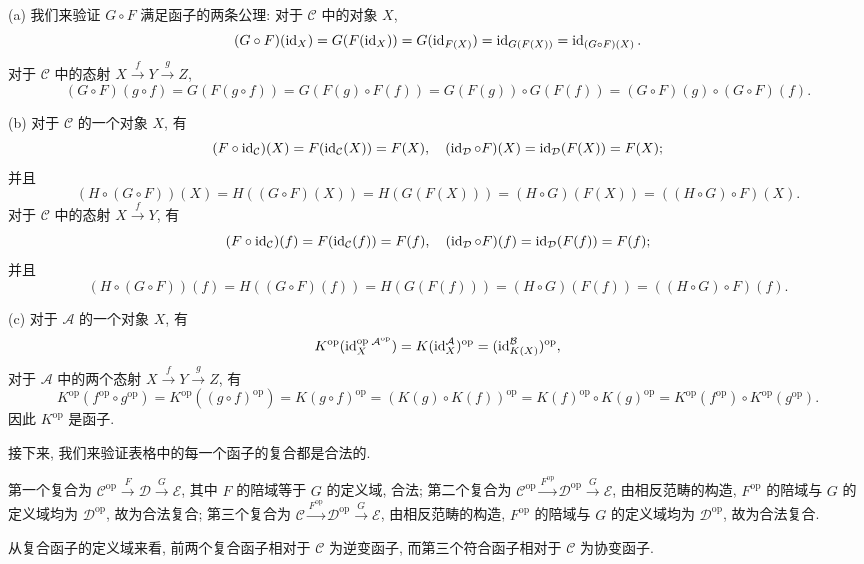\documentclass{article}
\newcommand{\op}{^{\mathrm{op}}}
\begin{document}
\begin{solution}
	(a) 我们来验证 $G\circ F$ 满足函子的两条公理: 对于 $\mathcal{C}$ 中的对象 $X$, 
	\[ (G\circ F)(\operatorname{id}_X) = G(F(\operatorname{id}_X)) = G(\operatorname{id}_{F(X)}) = \operatorname{id}_{G(F(X))} = \operatorname{id}_{(G\circ F)(X)}. \]
	对于 $\mathcal{C}$ 中的态射 $X \xrightarrow{f} Y \xrightarrow{g} Z$,
	\[ (G\circ F)(g\circ f) = G(F(g\circ f)) = G(F(g) \circ F(f))
	= G(F(g)) \circ G(F(f)) = (G\circ F)(g) \circ (G\circ F)(f). \]

	(b) 对于 $\mathcal{C}$ 的一个对象 $X$, 有
	\[ (F\circ \operatorname{id}_\mathcal{C}) (X) = F(\operatorname{id}_\mathcal{C}(X)) = F(X),\quad 
	(\operatorname{id}_\mathcal{D} \circ F)(X) = \operatorname{id}_\mathcal{D}(F(X)) = F(X); \]
	并且
	\[ (H\circ(G\circ F))(X) = H((G\circ F)(X)) = H(G(F(X)))
	=(H\circ G)(F(X)) = ((H\circ G)\circ F)(X). \]
	对于 $\mathcal{C}$ 中的态射 $X \xrightarrow{f}Y$, 有
	\[ (F\circ \operatorname{id}_\mathcal{C}) (f) = F(\operatorname{id}_\mathcal{C}(f)) = F(f),\quad 
	(\operatorname{id}_\mathcal{D} \circ F)(f) = \operatorname{id}_\mathcal{D}(F(f)) = F(f); \]
	并且
	\[ (H\circ(G\circ F))(f) = H((G\circ F)(f)) = H(G(F(f)))
	=(H\circ G)(F(f)) = ((H\circ G)\circ F)(f). \]

	(c) 对于 $\mathcal{A}$ 的一个对象 $X$, 有 
	\[ K\op(\id_X\op{}^{\mathcal{A}\op}) = K(\id_X^{\mathcal{A}})\op = (\id_{K(X)}^{\mathcal{B}})\op, \]
	对于 $\mathcal{A}$ 中的两个态射 $X \xrightarrow{f} Y \xrightarrow{g} Z$, 有
	\[ K\op(f\op \circ g\op) = K\op((g\circ f)\op) = K(g\circ f)\op
	=(K(g) \circ K(f))\op = K(f)\op \circ K(g)\op
	=K\op(f\op)\circ K\op(g\op). \]
	因此 $K\op$ 是函子.

	接下来, 我们来验证表格中的每一个函子的复合都是合法的. 

	第一个复合为 $\mathcal{C}\op \xrightarrow{F} \mathcal{D} \xrightarrow{G} \mathcal{E}$, 其中 $F$ 的陪域等于 $G$ 的定义域, 合法; 
	第二个复合为 $\mathcal{C}\op \xrightarrow{F\op} \mathcal{D}\op \xrightarrow{G} \mathcal{E}$, 由相反范畴的构造, $F\op$ 的陪域与 $G$ 的定义域均为 $\mathcal{D}\op$, 故为合法复合;
	第三个复合为 $\mathcal{C} \xrightarrow{F\op} \mathcal{D}\op \xrightarrow{G} \mathcal{E}$, 由相反范畴的构造, $F\op$ 的陪域与 $G$ 的定义域均为 $\mathcal{D}\op$, 故为合法复合.

	从复合函子的定义域来看, 前两个复合函子相对于 $\mathcal{C}$ 为逆变函子, 而第三个符合函子相对于 $\mathcal{C}$ 为协变函子.
\end{solution}
\end{document}
